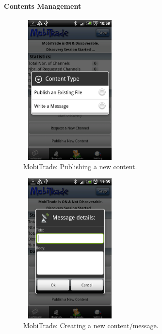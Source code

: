 \paragraph{Contents Management}

\begin{figure}[!h]
\begin{center}
\includegraphics[width=2in,height=3in]{Chapitre6/PublishContent.png}
\end{center}
\caption{MobiTrade: Publishing a new content.}
\label{PublishNewContent}
\end{figure}

\begin{figure}[!h]
\begin{center}
\includegraphics[width=2in,height=3in]{Chapitre6/WriteMessage.png}
\end{center}
\caption{MobiTrade: Creating a new content/message.}
\label{CreatingNewContent}
\end{figure}


